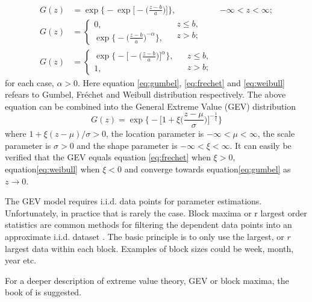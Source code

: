 \begin{align}
G(z) &=\exp\Big\{-\exp\Big[-\Big( \frac{z-b}{a}\Big) \Big]\Big\},  & -\infty < z < \infty;\label{eq:gumbel}\\
G(z) &=
  \begin{cases}
    0,\\
    \exp\big\{-\big(\frac{z-b}{a} \big)^{-\alpha} \big\},  
  \end{cases}
 \begin{split}
   &z\leq b, \\
   &z >b;\label{eq:frechet}\\
  \end{split}\\
G(z) &=
  \begin{cases}
    \exp\Big\{-\Big[-\Big( \frac{z-b}{a}\Big) \Big]^{\alpha}\Big\}, \\
    1,  
  \end{cases}  
 \begin{split}
   &z \leq b,\\
   &z>b;\label{eq:weibull}
  \end{split}
\end{align}
for each case, $\alpha>0$. Here equation \eqref{eq:gumbel}, \eqref{eq:frechet} and \eqref{eq:weibull} refears to Gumbel, Fr{\'e}chet and Weibull distribution respectively. The above equation can be combined into the General Extreme Value (GEV) distribution
\begin{equation}
\label{eq:GEV}
G(z)=\exp\Bigg\{-\Big[1+\xi \Big(\frac{z-\mu}{\sigma} \Big) \Big]^{-\frac{1}{\xi}} \Bigg\}
\end{equation}
where $1+\xi(z-\mu)/\sigma>0$, the location parameter is $-\infty<\mu<\infty$, the scale parameter is $\sigma>0$ and the shape parameter is $-\infty<\xi<\infty$. It can easily be verified that the GEV equals equation \eqref{eq:frechet} when $\xi>0$, equation\eqref{eq:weibull} when $\xi<0$ and converge towards equation\eqref{eq:gumbel} as $z \to 0$.

The GEV model requires i.i.d. data points for parameter estimations. Unfortunately, in practice that is rarely the case. Block maxima or r largest order statistics are common methods for filtering the dependent data points into an approximate i.i.d. dataset \cite[p.~66]{stuart}. The basic principle is to only use the largest, or $r$ largest data within each block. Examples of block sizes could be week, month, year etc.

For a deeper description of extreme value theory, GEV or block maxima, the book of \cite[Chapter~3]{stuart} is suggested.

